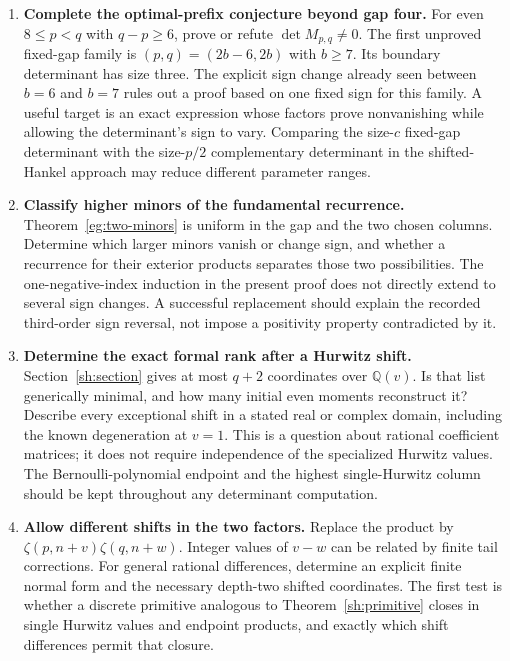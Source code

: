 \documentclass[11pt]{article}
\theoremstyle{definition}
\theoremstyle{remark}
\numberwithin{equation}{section}
\newcommand{\Q}{\mathbb Q}
\begin{document}
\begin{enumerate}[label=\textbf{Q\arabic*.},ref=Q\arabic*,itemsep=10pt]
\item \textbf{Complete the optimal-prefix conjecture beyond gap four.}
For even $8\le p<q$ with $q-p\ge6$, prove or refute
$\det M_{p,q}\ne0$. The first unproved fixed-gap family is
$(p,q)=(2b-6,2b)$ with $b\ge7$. Its boundary determinant has size
three. The explicit sign change already seen between $b=6$ and $b=7$
rules out a proof based on one fixed sign for this family. A useful
target is an exact expression whose factors prove nonvanishing while
allowing the determinant's sign to vary. Comparing the size-$c$
fixed-gap determinant with the size-$p/2$ complementary determinant
in the shifted-Hankel approach may reduce different parameter ranges.

\item \textbf{Classify higher minors of the fundamental recurrence.}
Theorem~\ref{eg:two-minors} is uniform in the gap and the two chosen
columns. Determine which larger minors vanish or change sign, and
whether a recurrence for their exterior products separates those two
possibilities. The one-negative-index induction in the present proof
does not directly extend to several sign changes. A successful
replacement should explain the recorded third-order sign reversal,
not impose a positivity property contradicted by it.

\item \textbf{Determine the exact formal rank after a Hurwitz shift.}
Section~\ref{sh:section} gives at most $q+2$ coordinates over
$\Q(v)$. Is that list generically minimal, and how many initial
even moments reconstruct it? Describe every exceptional shift in a
stated real or complex domain, including the known degeneration at
$v=1$. This is a question about rational coefficient matrices; it
does not require independence of the specialized Hurwitz values.
The Bernoulli-polynomial endpoint and the highest single-Hurwitz
column should be kept throughout any determinant computation.

\item \textbf{Allow different shifts in the two factors.}
Replace the product by
$\zeta(p,n+v)\zeta(q,n+w)$. Integer values of $v-w$ can be
related by finite tail corrections. For general rational differences,
determine an explicit finite normal form and the necessary depth-two
shifted coordinates. The first test is whether a discrete primitive
analogous to Theorem~\ref{sh:primitive} closes in single Hurwitz
values and endpoint products, and exactly which shift differences
permit that closure.


\end{enumerate}
\end{document}
